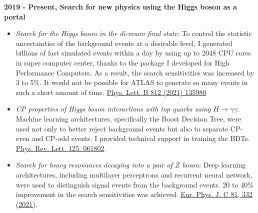 \noindent\textbf{2019 - Present, Search for new physics using the Higgs boson as a portal}
\begin{itemize}
    \item \textit{Search for the Higgs boson in the di-muon final state}: To control the statistic uncertainties of the background events at a desirable level, I generated billions of fast simulated events within a day by using up to 2048 CPU cores in super computer center, thanks to the package I developed for High Performance Computers. As a result, the search sensitivities was increased by 3 to 5\%. It would not be possible for ATLAS to generate so many events in such a short amount of time. \href{https://www.sciencedirect.com/science/article/pii/S0370269320307838}{Phys. Lett. B 812 (2021) 135980}

    \item \textit{CP properties of Higgs boson interactions with top quarks using $H \rightarrow \gamma\gamma$}: Machine learning architectures, specifically the Boost Decision Tree, were used not only to better reject background events but also to separate CP-even and CP-odd events. I provided technical support in training the BDTs. \href{https://journals.aps.org/prl/abstract/10.1103/PhysRevLett.125.061802}{Phys. Rev. Lett. 125. 061802}
    
    \item \textit{Search for heavy resonances decaying into a pair of $Z$ boson}: Deep learning architectures, including multilayer perceptrons and recurrent neural network, were used to distinguish signal events from the background events. 20 to 40\% improvement in the search sensitivities was achieved. \href{https://link.springer.com/article/10.1140/epjc/s10052-021-09013-y}{Eur. Phys. J. C 81, 332 (2021)}.
\end{itemize}


